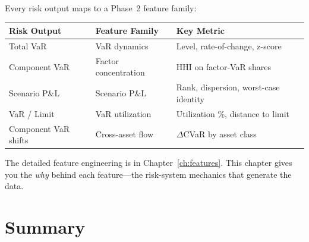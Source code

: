 \begin{keyidea}
Every risk output maps to a Phase~2 feature family:

\begin{center}
\small
\begin{tabular}{@{}lll@{}}
\toprule
\textbf{Risk Output} & \textbf{Feature Family} & \textbf{Key Metric} \\
\midrule
Total VaR & VaR dynamics
  & Level, rate-of-change, z-score \\
Component VaR & Factor concentration
  & HHI on factor-VaR shares \\
Scenario P\&L & Scenario P\&L
  & Rank, dispersion, worst-case identity \\
VaR / Limit & VaR utilization
  & Utilization \%, distance to limit \\
Component VaR shifts & Cross-asset flow
  & $\Delta$CVaR by asset class \\
\bottomrule
\end{tabular}
\end{center}

The detailed feature engineering is in Chapter~\ref{ch:features}.  This
chapter gives you the \emph{why} behind each feature---the risk-system
mechanics that generate the data.
\end{keyidea}


\section{Summary}
\label{sec:risk-summary}

